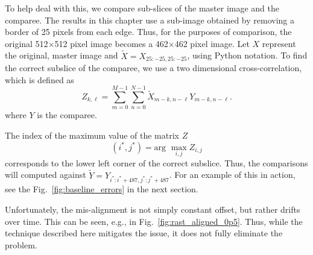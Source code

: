 \documentclass[twocolumn,twoside]{IEEEtran/IEEEtran}
\begin{document}
To help deal with this, we compare sub-slices of the master image and the
comparee. The results in this chapter use a sub-image obtained by removing a
border of 25 pixels from each edge. Thus, for the purposes of comparison, the
original 512$\times$512 pixel image becomes a 462$\times$462 pixel image. Let
$X$ represent the original, master image and ${\tilde X=X_{25:-25, 25:-25}}$,
using Python notation. To find the correct subslice of the comparee, we use a
two dimensional cross-correlation, which is defined as
\begin{equation}
  Z_{k,\ell} = \sum_{m=0}^{M-1}\sum_{n=0}^{N-1} \tilde{X}_{m-k, n-\ell}Y_{m-k, n-\ell}.
\end{equation}
where $Y$ is the comparee.

The index of the maximum value of the matrix $Z$
\begin{equation}
  (i^*,j^*) = \textrm{arg~} \max_{i,j}Z_{i,j}
\end{equation}
corresponds to the lower left corner of the correct subslice. Thus, the
comparisons will computed against $\tilde{Y} = Y_{i^*:i^*+487, j^*:j^*+487}$.
For an example of this in action, see the Fig.~\ref{fig:baseline_errors} in the
next section.

Unfortunately, the mis-alignment is not simply constant offset, but rather
drifts over time. This can be seen, e.g., in Fig.~\ref{fig:rast_aligned_0p5}.
Thus, while the technique described here mitigates the issue, it does not fully
eliminate the problem.
\end{document}
